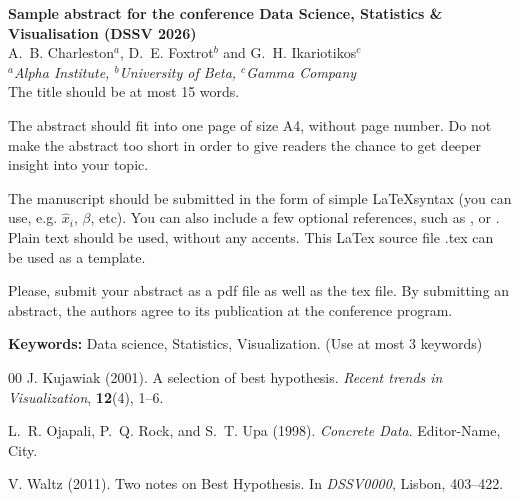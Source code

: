 \documentclass[a4paper,12pt]{article}
\begin{document}
{\Large\bf Sample abstract for the conference Data Science, Statistics \& Visualisation (DSSV 2026) }\\[4mm]

A.~B. Charleston$^a$, D.~E. Foxtrot$^b$ and G.~H. Ikariotikos$^c$\\ 				

{\small \em $^a$Alpha Institute, $^b$University of Beta, $^c$Gamma Company}\\[3mm]

The title should be at most 15 words.

The abstract should fit into one page of size A4, without page number. 
Do not make the abstract too short in order to give readers the chance to get deeper insight into your topic.

The manuscript should be submitted in the form of simple \LaTeX syntax (you can use, e.g. $\hat{x}_i$, $\beta$, etc). You can also include a few optional references, such as \cite{journal01}, \cite{book98} or \cite{procc11}. Plain text should be used, without any accents. This LaTex source file .tex can be used as a template.

Please, submit your abstract as a pdf file as well as the tex file. By submitting an abstract, the authors agree to its publication at the conference program.

\textbf{Keywords:} Data science, Statistics, Visualization. (Use at most 3 keywords)

\begin{thebibliography}{00}
 J. Kujawiak (2001). A selection of best hypothesis. \emph{Recent trends in Visualization}, \textbf{12}(4), 1--6.

L.~R. Ojapali, P.~Q. Rock, and S.~T. Upa (1998). \emph{Concrete Data}. Editor-Name, City.

 V. Waltz (2011). Two notes on Best Hypothesis. In \emph{DSSV0000}, Lisbon, 403--422.
\end{thebibliography}
\end{document}
